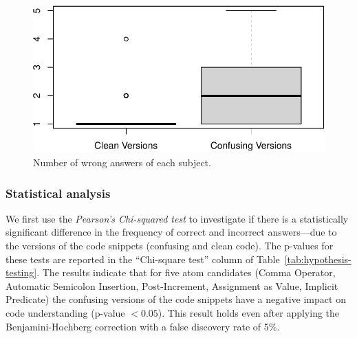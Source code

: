 \begin{figure}[b!]
\noindent
 \centering
 \includegraphics[width=\columnwidth]{images/wrong-answers-plot-1.pdf}
 \caption{Number of wrong answers of each subject.}
 \label{fig:boxplotcorrectness}
 \end{figure}%
 

\subsubsection*{Statistical analysis}

We first use the \emph{Pearson's Chi-squared test}
to investigate if there is a statistically significant difference in the frequency of correct and incorrect answers---due to the versions of the code snippets (confusing and clean code). The p-values for these tests are reported in the ``Chi-square test'' column of Table~\ref{tab:hypothesis-testing}. The results indicate that for five atom candidates (Comma Operator, Automatic Semicolon Insertion, Post-Increment, Assignment as Value, Implicit Predicate) the confusing versions of the code snippets have a negative impact on code understanding (p-value $< 0.05$). This result holds even after applying the Benjamini-Hochberg correction with a false discovery rate of 5\%. 

